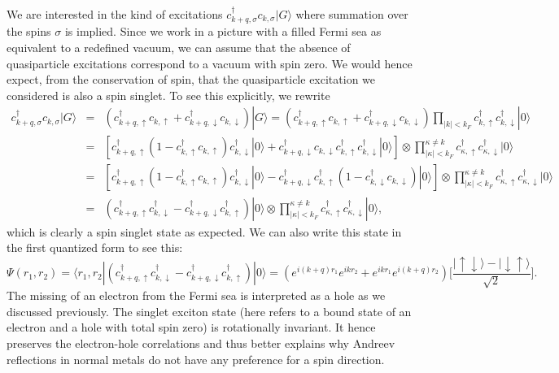 \documentclass[10pt,letterpaper,aps,onecolumn,superscriptaddress,floatfix,notitlepage]{revtex4-1}
\begin{document}
	We are interested in the kind of excitations $c_{k+q,\sigma}^{\dagger}c_{k,\sigma}|G\rangle$ where summation over the spins $\sigma$ is implied. Since we work in a picture with a filled Fermi sea as equivalent to a redefined vacuum, we can assume that the absence of quasiparticle excitations correspond to a vacuum with spin zero. We would hence expect, from the conservation of spin, that the quasiparticle excitation we considered is also a spin singlet. To see this explicitly, we rewrite 
	\begin{eqnarray}
	\label{exc}	c_{k+q,\sigma}^{\dagger}c_{k,\sigma}|G\rangle &=& (c_{k+q,\uparrow}^{\dagger}c_{k,\uparrow} +  c_{k+q,\downarrow}^{\dagger}c_{k,\downarrow})|G\rangle = (c_{k+q,\uparrow}^{\dagger}c_{k,\uparrow} +  c_{k+q,\downarrow}^{\dagger}c_{k,\downarrow})\prod_{|k|<k_{F}}c_{k,\uparrow}^{\dagger}c_{k,\downarrow}^{\dagger}|0\rangle\\
	&=&[c_{k+q,\uparrow}^{\dagger}(1-c_{k,\uparrow}^{\dagger}c_{k,\uparrow})c_{k,\downarrow}^{\dagger}|0\rangle +  c_{k+q,\downarrow}^{\dagger}c_{k,\downarrow}c_{k,\uparrow}^{\dagger}c_{k,\downarrow}^{\dagger}|0\rangle]\otimes\prod^{\kappa\neq k}_{|\kappa|<k_{F}}c_{\kappa,\uparrow}^{\dagger}c_{\kappa,\downarrow}^{\dagger}|0\rangle  \\
	&=&[c_{k+q,\uparrow}^{\dagger}(1-c_{k,\uparrow}^{\dagger}c_{k,\uparrow})c_{k,\downarrow}^{\dagger}|0\rangle -  c_{k+q,\downarrow}^{\dagger}c_{k,\uparrow}^{\dagger}(1-c_{k,\downarrow}^{\dagger}c_{k,\downarrow})|0\rangle]\otimes\prod^{\kappa\neq k}_{|\kappa|<k_{F}}c_{\kappa,\uparrow}^{\dagger}c_{\kappa,\downarrow}^{\dagger}|0\rangle\\
	&=&(c_{k+q,\uparrow}^{\dagger}c_{k,\downarrow}^{\dagger} -  c_{k+q,\downarrow}^{\dagger}c_{k,\uparrow}^{\dagger})|0\rangle\otimes\prod^{\kappa\neq k}_{|\kappa|<k_{F}}c_{\kappa,\uparrow}^{\dagger}c_{\kappa,\downarrow}^{\dagger}|0\rangle,
	\end{eqnarray}	
	which is clearly a spin singlet state as expected. We can also write this state in the first quantized form to see this:
	\begin{equation}
	\Psi(r_{1},r_{2}) = \langle r_{1},r_{2}|(c_{k+q,\uparrow}^{\dagger}c_{k,\downarrow}^{\dagger} -  c_{k+q,\downarrow}^{\dagger}c_{k,\uparrow}^{\dagger})|0\rangle = (e^{i(k+q)r_{1}}e^{ikr_{2}}+e^{ikr_{1}}e^{i(k+q)r_{2}})\bigg[\frac{|\uparrow\downarrow\rangle-|\downarrow\uparrow\rangle}{\sqrt{2}}\bigg].
	\end{equation}	
	The missing of an electron from the Fermi sea is interpreted as a hole as we discussed previously. 	The singlet exciton state (here refers to a bound state of an electron and a hole with total spin zero) is rotationally invariant. It hence preserves the electron-hole correlations and thus better explains why Andreev reflections in normal metals do not have any preference for a spin direction.
\end{document}
